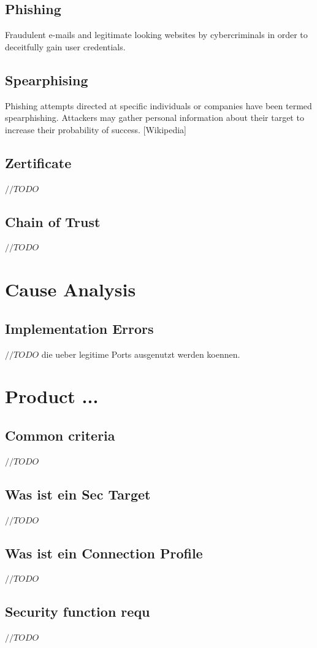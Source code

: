 \documentclass[a4paper, 12pt]{article}
\begin{document}
\subsection{Phishing}
Fraudulent e-mails and legitimate looking websites by cybercriminals in order to deceitfully gain user credentials.
\subsection{Spearphising}
Phishing attempts directed at specific individuals or companies have been termed spearphishing. Attackers may gather personal information about their target to increase their probability of success. [Wikipedia]
\subsection{Zertificate}
$ //TODO $
\subsection{Chain of Trust}
$ //TODO $

\section{Cause Analysis}
\subsection{Implementation Errors}
$ //TODO $
die ueber legitime Ports ausgenutzt werden koennen.

\section{Product ...}
\subsection{Common criteria}
$ //TODO $
\subsection{Was ist ein Sec Target}
$ //TODO $
\subsection{Was ist ein Connection Profile}
$ //TODO $
\subsection{Security function requ}
$ //TODO $
\end{document}
